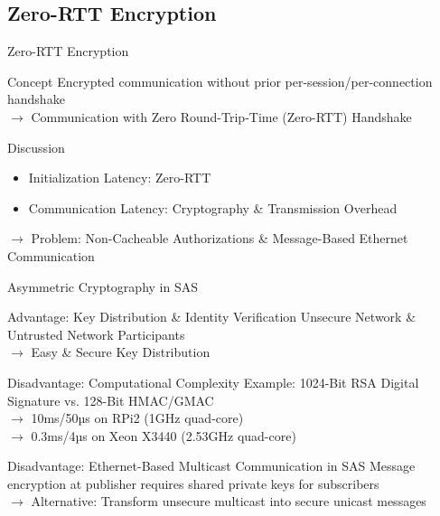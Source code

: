 \documentclass[en]{sdqbeamer}
\begin{document}
\subsection{Zero-RTT Encryption}
\begin{frame}{Zero-RTT Encryption}
    \begin{greenblock}{Concept}
        Encrypted communication without prior per-session/per-connection handshake
        \\$\rightarrow$ Communication with Zero Round-Trip-Time (Zero-RTT) Handshake
    \end{greenblock}

    \begin{blueblock}{Discussion}
        \begin{itemize}
            \item Initialization Latency: Zero-RTT
            \item Communication Latency: Cryptography \& Transmission Overhead
        \end{itemize}
        $\rightarrow$ Problem: Non-Cacheable Authorizations \& Message-Based Ethernet Communication
    \end{blueblock}
\end{frame}

\begin{frame}{Asymmetric Cryptography in SAS}
    \begin{greenblock}{Advantage: Key Distribution \& Identity Verification}
        Unsecure Network \& Untrusted Network Participants
        \\$\rightarrow$ Easy \& Secure Key Distribution
    \end{greenblock}
    \begin{redblock}{Disadvantage: Computational Complexity \parencite{Elbez2019,Ishchenko2018}}
        Example: 1024-Bit RSA Digital Signature vs. 128-Bit HMAC/GMAC
        \\$\rightarrow$ 10ms/50µs  on RPi2 (1GHz quad-core)
        \\$\rightarrow$ 0.3ms/4µs on Xeon X3440 (2.53GHz quad-core) 
    \end{redblock}
    \begin{redblock}{Disadvantage: Ethernet-Based Multicast Communication in SAS}
        Message encryption at publisher requires shared private keys for subscribers
        \\$\rightarrow$ Alternative: Transform unsecure multicast into secure unicast messages
    \end{redblock}
\end{frame}
\end{document}
